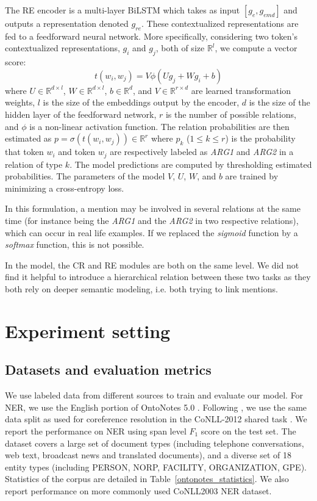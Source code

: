\documentclass[letterpaper]{article}
\begin{document}
The RE encoder is a multi-layer BiLSTM which takes as input $[g_{e}, g_{emd}]$ and outputs a representation denoted $g_{re}$. These contextualized representations are fed to a feedforward neural network. More specifically, considering two token's contextualized representations, $g_i$ and $g_j$, both of size $\mathbb{R}^{l}$, we compute a vector score:
\begin{equation}
t(w_i, w_j) = V \phi (U g_j + W g_i + b)
\end{equation}
where $U \in \mathbb{R}^{d \times l}$, $W \in \mathbb{R}^{d \times l}$, $b \in \mathbb{R}^{d}$, and $V \in \mathbb{R}^{r \times d}$ are learned transformation weights, $l$ is the size of the embeddings output by the encoder, $d$ is the size of the hidden layer of the feedforward network, $r$ is the number of possible relations, and $\phi$ is a non-linear activation function. The relation probabilities are then estimated as $p = \sigma (t(w_i, w_j)) \in \mathbb{R}^{r}$ where $p_k$ ($1 \leq k \leq r$) is the probability that token $w_i$ and token $w_j$ are respectively labeled as \textit{ARG1} and \textit{ARG2} in a relation of type $k$. The model predictions are computed by thresholding estimated probabilities. The parameters of the model $V$, $U$, $W$, and $b$ are trained by minimizing a cross-entropy loss.

In this formulation, a mention may be involved in several relations at the same time (for instance being the \textit{ARG1} and the \textit{ARG2} in two respective relations), which can occur in real life examples. If we replaced the \textit{sigmoid} function by a \textit{softmax} function, this is not possible.

In the model, the CR and RE modules are both on the same level. We did not find it helpful to introduce a hierarchical relation between these two tasks as they both rely on deeper semantic modeling, i.e. both trying to link mentions.



\section{Experiment setting}

\subsection{Datasets and evaluation metrics}

We use labeled data from different sources to train and evaluate our model. For NER, we use the English portion of OntoNotes 5.0 \cite{OntoNotes2}. Following \citeauthor{Strubell2017} , we use the same data split as used for coreference resolution in the CoNLL-2012 shared task \cite{Pradhan2012Conll2012ST}. We report the performance on NER using span level $F_{1}$ score on the test set. The dataset covers a large set of document types (including telephone conversations, web text, broadcast news and translated documents), and a diverse set of 18 entity types (including PERSON, NORP, FACILITY, ORGANIZATION, GPE). Statistics of the corpus are detailed in Table~\ref{ontonotes_statistics}. We also report performance on more commonly used CoNLL2003 NER dataset.
\end{document}

